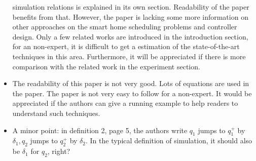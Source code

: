 \documentclass{sig-alternate}
\begin{document}
\begin{itemize}
simulation 
relations is explained in its own section. Readability of the paper benefits
from 
that. However, the paper is lacking some more information on other approaches
on 
the smart home scheduling problems and controller design.
Only a few related works are introduced in the introduction section, for an
non-expert, it is difficult to get a estimation of the state-of-the-art
techniques in this area. Furthermore, it will be appreciated if there is more
comparison with the related work in the experiment section.
\item The readability of this paper is not very good. Lots of equations are used
in the paper. The paper is not very easy to follow for a non-expert. It would
be appreciated if the authors can give a running example to help readers to
understand such techniques.
\item A minor point: in definition 2, page 5, the authors write $q_1$ jumps to $q_1^+$
by $\delta_1, q_2$ jumps to $q_2^+$ by $\delta_2$. In the typical definition of
simulation, it should also be $\delta_1$ for $q_2$, right?
\end{itemize}





















%


%

\newpage
\appendix



\end{document}

